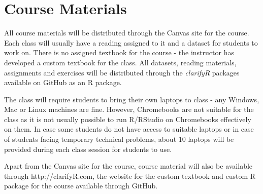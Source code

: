 \documentclass[11pt, letterpaper, twoside]{memoir}\usepackage{knitr}
\begin{document}
\section{Course Materials}

All course materials will be distributed through the Canvas site for the course. Each class will usually have a reading assigned to it and a dataset for students to work on. There is no assigned textbook for the course - the instructor has developed a custom textbook for the class. All datasets, reading materials, assignments and exercises will be distributed through the \emph{clarifyR} packages available on GitHub as an R package.

The class will require students to bring their own laptops to class - any Windows, Mac or Linux machines are fine. However, Chromebooks are not suitable for the class as it is not usually possible to run R/RStudio on Chromebooks effectively on them. In case some students do not have access to suitable laptops or in case of students facing temporary technical problems, about 10 laptops will be provided during each class session for students to use.

Apart from the Canvas site for the course, course material will also be available through http://clarifyR.com, the website for the custom textbook and custom R package for the course available through GitHub.
\end{document}
